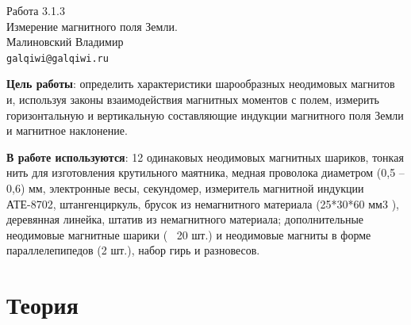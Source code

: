 
\usepackage{wrapfig}



\begin{center}
  \LARGE{Работа 3.1.3}\\[0.2cm]
  \LARGE{Измерение магнитного поля Земли.}\\[0.2cm]
  \large{Малиновский Владимир}\\[0.2cm]
  \normalsize{\texttt{galqiwi@galqiwi.ru}}
\end{center}


\textbf{Цель работы}: определить характеристики шарообразных неодимовых магнитов и, используя
законы взаимодействия магнитных моментов с полем, измерить горизонтальную и вертикальную
составляющие индукции магнитного поля Земли и магнитное наклонение.


\textbf{В работе используются}: 12 одинаковых неодимовых магнитных шариков, тонкая нить для
изготовления крутильного маятника, медная проволока диаметром (0,5 – 0,6) мм, электронные весы,
секундомер, измеритель магнитной индукции АТЕ-8702, штангенциркуль, брусок из немагнитного
материала (25*30*60 мм3
), деревянная линейка, штатив из немагнитного материала;
дополнительные неодимовые магнитные шарики (~ 20 шт.) и неодимовые магниты в форме параллелепипедов (2 шт.), набор гирь и разновесов.
\section*{Теория}
